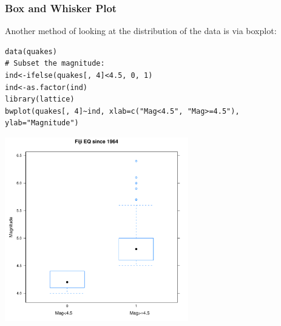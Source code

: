 \begin{frame}
\frametitle{Box and Whisker Plot}

Another method of looking at the distribution of the data is via boxplot:
  		\begin{lstlisting}
data(quakes)		
# Subset the magnitude:
ind<-ifelse(quakes[, 4]<4.5, 0, 1)
ind<-as.factor(ind)
library(lattice)
bwplot(quakes[, 4]~ind, xlab=c("Mag<4.5", "Mag>=4.5"), ylab="Magnitude")
		\end{lstlisting}

        \begin{center}
         \includegraphics[width=0.6\textwidth]{images/bwplot.pdf}
        \end{center}
\end{frame}

